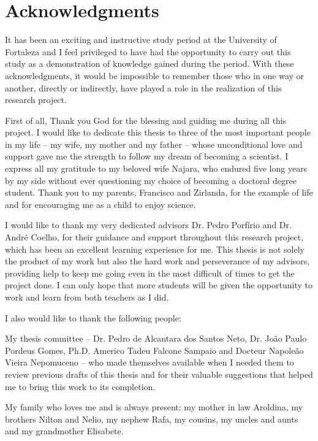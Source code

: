 \chapter*{Acknowledgments} 



It has been an exciting and instructive study period at the University of Fortaleza and I feel privileged to have had the opportunity to carry out this study as a demonstration of
knowledge gained during the period. With these acknowledgments, it would be impossible to remember those who in one way or another, directly or indirectly, have played a role in the realization of this research project. 

First of all, Thank you God for the blessing and guiding me during all this project. I would like to dedicate this thesis to three of the most important people in my life
– my wife, my mother and my father – whose unconditional love and support gave me the
strength to follow my dream of becoming a scientist. I express all my gratitude to my beloved wife Najara, who endured five long years by my side without ever questioning my choice of becoming a doctoral degree student. Thank you to my parents, Francisco and Zirlanda,  for the example of life and for encouraging me as a child to enjoy science.

I would like to thank my very dedicated advisors Dr. Pedro Porfírio and Dr. André Coelho, for their guidance and support throughout this research project, which has been an excellent
learning experience for me. This thesis is not solely the product of my work but also the hard work and perseverance of my advisors, providing help to keep me going even in the most difficult of times to get the project done. I can only hope that more students will be given the opportunity to work and learn from both teachers as I did.

I also would like to thank the following people:

My thesis committee – Dr. Pedro de Alcantara dos Santos Neto, Dr. João Paulo Pordeus Gomes, Ph.D. Americo Tadeu Falcone Sampaio and Docteur Napoleão Vieira Nepomuceno – who made themselves available when I needed them to review previous drafts of this thesis and for their valuable suggestions that helped me to bring this work to its completion.

My family who loves me and is always present: my mother in law Aroldina, my brothers Nilton and Nelio, my nephew Rafa, my cousins, my uncles and aunts and my grandmother Elisabete.

